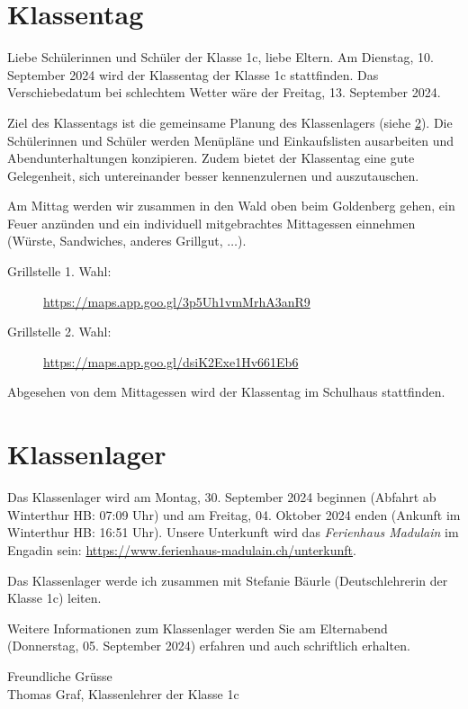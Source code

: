 


\thispagestyle{empty}

\section{Klassentag}\label{sec:tag}

Liebe Schülerinnen und Schüler der Klasse 1c, liebe Eltern. Am Dienstag, 10. September 2024 wird der Klassentag der Klasse 1c stattfinden. Das Verschiebedatum bei schlechtem Wetter wäre der Freitag, 13. September 2024. 

Ziel des Klassentags ist die gemeinsame Planung des Klassenlagers (siehe \cref{sec:lager}). Die Schülerinnen und Schüler werden Menüpläne und Einkaufslisten ausarbeiten und Abendunterhaltungen konzipieren. 
Zudem bietet der Klassentag eine gute Gelegenheit, sich untereinander besser kennenzulernen und auszutauschen.

Am Mittag werden wir zusammen in den Wald oben beim Goldenberg gehen, ein Feuer anzünden und ein individuell mitgebrachtes Mittagessen einnehmen (Würste, Sandwiches, anderes Grillgut, $\ldots$).

\begin{description}
  \item[Grillstelle 1. Wahl:] \url{https://maps.app.goo.gl/3p5Uh1vmMrhA3anR9}
  \item[Grillstelle 2. Wahl:] \url{https://maps.app.goo.gl/dsiK2Exe1Hv661Eb6}
\end{description}

Abgesehen von dem Mittagessen wird der Klassentag im Schulhaus stattfinden.



\section{Klassenlager}\label{sec:lager}
Das Klassenlager wird am Montag, 30. September 2024 beginnen (Abfahrt ab Winterthur HB: 07:09 Uhr) und am Freitag, 04. Oktober 2024 enden (Ankunft im Winterthur HB: 16:51 Uhr). Unsere Unterkunft wird das \textit{Ferienhaus Madulain} im Engadin sein: \url{https://www.ferienhaus-madulain.ch/unterkunft}.

Das Klassenlager werde ich zusammen mit Stefanie Bäurle (Deutschlehrerin der Klasse 1c) leiten.

Weitere Informationen zum Klassenlager werden Sie am Elternabend (Donnerstag, 05. September 2024) erfahren und auch schriftlich erhalten.


\vspace{10cm}
Freundliche Grüsse\\
Thomas Graf, Klassenlehrer der Klasse 1c


